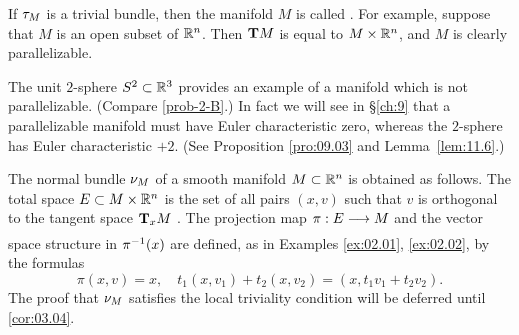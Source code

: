 \documentclass[../main]{subfiles}
\begin{document}
If $\tangentBundle{M}$ is a trivial bundle, then the manifold $M$ is called .
For example, suppose that $M$ is an open subset of $\bR^n$. Then $\tangentTS M$ is
equal to $M \times \bR^n$, and $M$ is clearly parallelizable.

The unit $2$-sphere $\Sphere^{2}\subset \bR^3$ provides an example of a manifold which
is not parallelizable. (Compare \ref{prob-2-B}.) In fact we will see in \S\ref{ch:9}
that a parallelizable manifold must have Euler characteristic zero, whereas
the $2$-sphere has Euler characteristic $+2$. (See Proposition \ref{pro:09.03} and Lemma~\ref{lem:11.6}.)


\begin{example}\label{ex:02.03}
The normal bundle $\normalbundle{M}$ of a smooth manifold $M \subset \bR^n$ is
obtained as follows. The total space
$\total \subset M \times \bR^n$
is the set of all pairs $(x, v)$ such that $v$ is orthogonal to the tangent
space $\tangentspace Mx$ . The projection map $\pi: \total \varrightarrow{} M$ and the vector space 
structure in $\pi\inv(x)$ are defined, as in Examples \ref{ex:02.01}, \ref{ex:02.02}, by the formulas
\[\pi(x, v) = x,
\quad t_1(x, v_1) + t_2(x, v_2) = (x, t_1v_1 + t_2v_2).\]
The proof that $\normalbundle{M}$ satisfies
the local triviality condition will be deferred until \ref{cor:03.04}.
\end{example}
\end{document}
